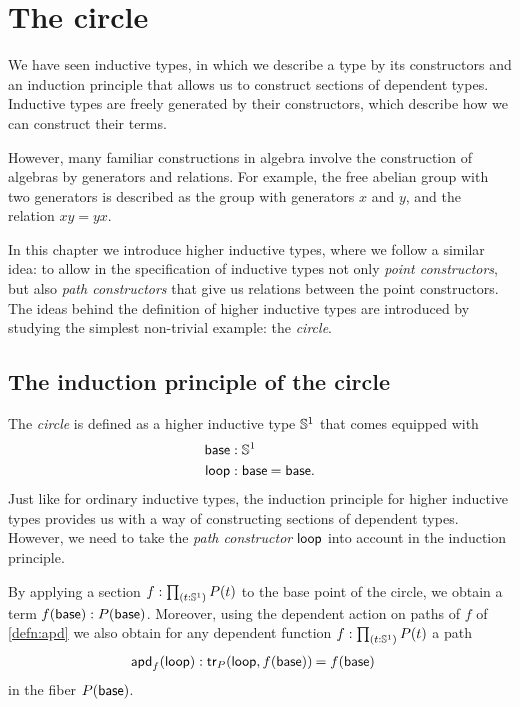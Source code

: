 
\chapter{The circle}

We have seen inductive types, in which we describe a type by its constructors and an induction principle that allows us to construct sections of dependent types. Inductive types are freely generated by their constructors, which describe how we can construct their terms. 

However, many familiar constructions in algebra involve the construction of algebras by generators and relations. 
For example, the free abelian group with two generators is described as the group with generators $x$ and $y$, and the relation $xy=yx$. 

In this chapter we introduce higher inductive types, where we follow a similar idea: to allow in the specification of inductive types not only \emph{point constructors}, but also \emph{path constructors} that give us relations between the point constructors. 
The ideas behind the definition of higher inductive types are introduced by studying the simplest non-trivial example: the \emph{circle}.

\section{The induction principle of the circle}
The \emph{circle} is defined as a higher inductive type $\mathbb{S}^{1}$ that comes equipped with
\begin{align*}
\base & : \sphere{1} \\
\lloop & : \id{\base}{\base}.
\end{align*}
Just like for ordinary inductive types, the induction principle for higher inductive types provides us with a way of constructing sections of dependent types. However, we need to take the \emph{path constructor} $\mathsf{loop}$ into account in the induction principle. 

By applying a section $f:\prd{t:\sphere{1}}P(t)$ to the base point of the circle, we obtain a term $f(\mathsf{base}):P(\mathsf{base})$. Moreover, using the dependent action on paths of $f$ of \autoref{defn:apd} we also obtain for any dependent function $f:\prd{t:\sphere{1}}P(t)$ a path
\begin{align*}
\apd{f}{\lloop} & : \id{\mathsf{tr}_P(\lloop,f(\base))}{f(\base)}
\end{align*}
in the fiber $P(\mathsf{base})$.


